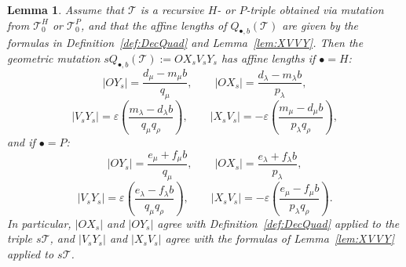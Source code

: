\documentclass[11pt, reqno]{amsart}
\newtheorem{lemma}[thm]{Lemma}
\theoremstyle{remark}
\numberwithin{equation}{subsection}
\numberwithin{figure}{section}
\theoremstyle{customremark}
\begin{document}
\begin{lemma}\label{lem:sLengths}
Assume that $\mathcal{T}$ is a recursive $H$- or $P$-triple obtained via mutation from $\mathcal{T}_0^H$ or $\mathcal{T}_0^P$, and that the affine lengths of $Q_{\bullet,b}(\mathcal{T})$ are given by the formulas in Definition~\ref{def:DecQuad} and Lemma~\ref{lem:XVVY}. Then the geometric mutation $sQ_{\bullet,b}(\mathcal{T}) := OX_sV_sY_s$ has affine lengths if $\bullet=H$:
\[
|OY_s| = \frac{d_\mu - m_\mu b}{q_\mu}, \qquad |OX_s| = \frac{d_\lambda - m_\lambda b}{p_\lambda},
\]
\[
|V_sY_s| = \varepsilon\left(\frac{m_\lambda - d_\lambda b}{q_\mu q_\rho}\right), \qquad |X_sV_s| = -\varepsilon\left(\frac{m_\mu - d_\mu b}{p_\lambda q_\rho}\right),
\]
and if $\bullet=P$:
\[
|OY_s| = \frac{e_\mu + f_\mu b}{q_\mu}, \qquad |OX_s| = \frac{e_\lambda + f_\lambda b}{p_\lambda},
\]
\[
|V_sY_s| = \varepsilon\left(\frac{e_\lambda - f_\lambda b}{q_\mu q_\rho}\right), \qquad |X_sV_s| = -\varepsilon\left(\frac{e_\mu - f_\mu b}{p_\lambda q_\rho}\right).
\]
In particular, $|OX_s|$ and $|OY_s|$ agree with Definition~\ref{def:DecQuad} applied to the triple $s\mathcal{T}$, and $|V_sY_s|$ and $|X_sV_s|$ agree with the formulas of Lemma~\ref{lem:XVVY} applied to $s\mathcal{T}$.

\end{lemma}
\end{document}
